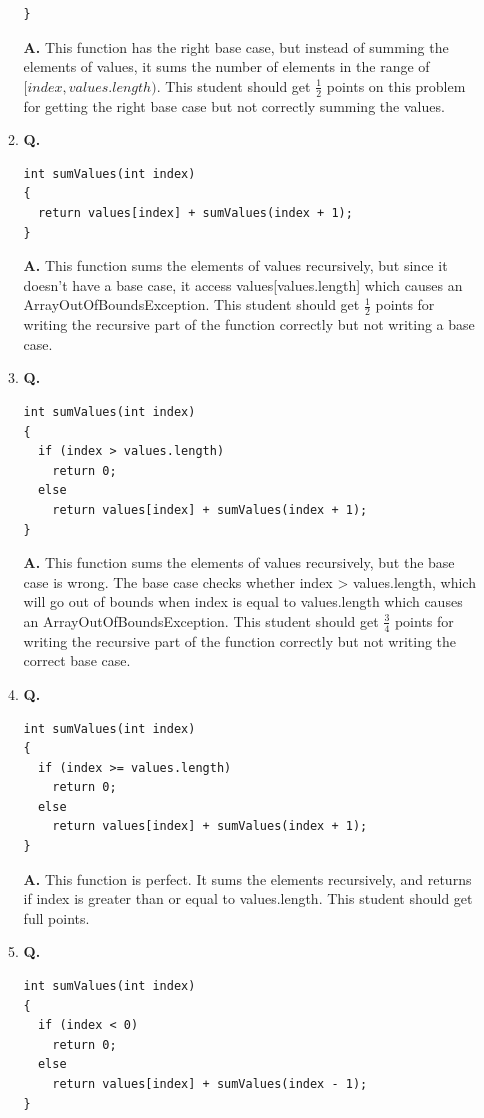 \documentclass[12pt]{article}
\begin{document}
\begin{enumerate}
\begin{enumerate}[label=\Alph*]
\begin{lstlisting}
}
    \end{lstlisting}
  \textbf{A.} This function has the right base case, but instead of summing the elements of values, it sums the number of elements in the range of $[index, values.length)$. This student should get $\frac{1}{2}$ points on this problem for getting the right base case but not correctly summing the values.
  \\
  \item \textbf{Q.}
    \begin{lstlisting}
int sumValues(int index)
{
  return values[index] + sumValues(index + 1);
}
    \end{lstlisting}
  \textbf{A.} This function sums the elements of values recursively, but since it doesn't have a base case, it access values[values.length] which causes an ArrayOutOfBoundsException. This student should get $\frac{1}{2}$ points for writing the recursive part of the function correctly but not writing a base case.
  \\
  \item \textbf{Q.}
    \begin{lstlisting}
int sumValues(int index)
{
  if (index > values.length)
    return 0;
  else
    return values[index] + sumValues(index + 1);
}
    \end{lstlisting}
  \textbf{A.} This function sums the elements of values recursively, but the base case is wrong. The base case checks whether index > values.length, which will go out of bounds when index is equal to values.length which causes an ArrayOutOfBoundsException. This student should get $\frac{3}{4}$ points for writing the recursive part of the function correctly but not writing the correct base case.
  \\
  \item \textbf{Q.}
    \begin{lstlisting}
int sumValues(int index)
{
  if (index >= values.length)
    return 0;
  else
    return values[index] + sumValues(index + 1);
}
    \end{lstlisting}
  \textbf{A.} This function is perfect. It sums the elements recursively, and returns if index is greater than or equal to values.length. This student should get full points.
  \\
  \item \textbf{Q.}
    \begin{lstlisting}
int sumValues(int index)
{
  if (index < 0)
    return 0;
  else
    return values[index] + sumValues(index - 1);
}
    \end{lstlisting}

\end{enumerate}
\end{enumerate}
\end{document}
